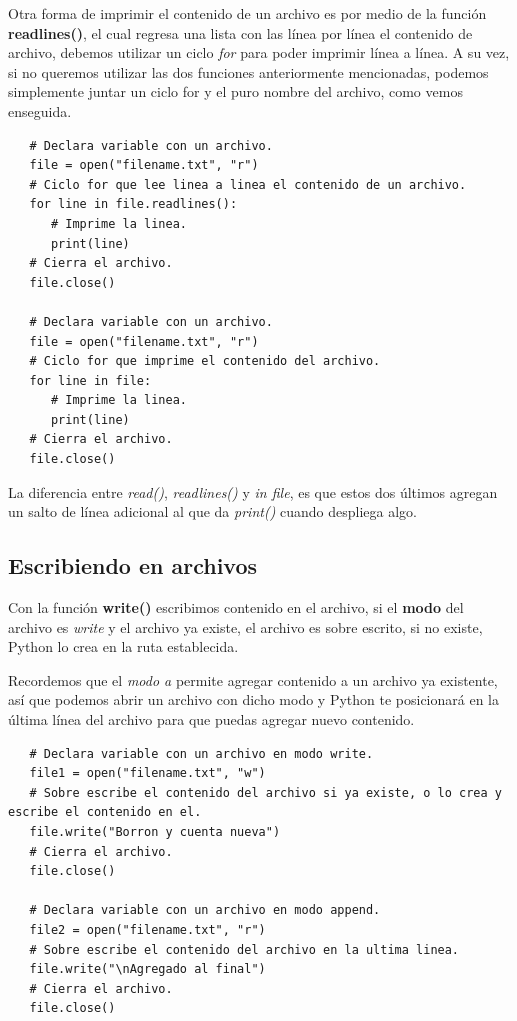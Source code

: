 Otra forma de imprimir el contenido de un archivo es por medio de la función \textbf{readlines()}, el cual regresa una lista con las línea por línea el contenido de archivo, debemos utilizar un ciclo \textit{for} para poder imprimir línea a línea. A su vez, si no queremos utilizar las dos funciones anteriormente mencionadas, podemos simplemente juntar un ciclo for y el puro nombre del archivo, como vemos enseguida.
\begin{lstlisting}
   # Declara variable con un archivo.
   file = open("filename.txt", "r")
   # Ciclo for que lee linea a linea el contenido de un archivo.
   for line in file.readlines():
      # Imprime la linea.
      print(line)
   # Cierra el archivo.
   file.close()
   
   # Declara variable con un archivo.
   file = open("filename.txt", "r")
   # Ciclo for que imprime el contenido del archivo.
   for line in file:
      # Imprime la linea.
      print(line)
   # Cierra el archivo.
   file.close()
\end{lstlisting}

La diferencia entre \textit{read()}, \textit{readlines()} y \textit{in file}, es que estos dos últimos agregan un salto de línea adicional al que da \textit{print()} cuando despliega algo.


\subsection{Escribiendo en archivos}
\hspace{0.55cm}Con la función \textbf{write()} escribimos contenido en el archivo, si el \textbf{modo} del archivo es \textit{write} y el archivo ya existe, el archivo es sobre escrito, si no existe, Python lo crea en la ruta establecida.

Recordemos que el \textit{modo a} permite agregar contenido a un archivo ya existente, así que podemos abrir un archivo con dicho modo y Python te posicionará en la última línea del archivo para que puedas agregar nuevo contenido.
\begin{lstlisting}
   # Declara variable con un archivo en modo write.
   file1 = open("filename.txt", "w")
   # Sobre escribe el contenido del archivo si ya existe, o lo crea y escribe el contenido en el.
   file.write("Borron y cuenta nueva")
   # Cierra el archivo.
   file.close()
   
   # Declara variable con un archivo en modo append.
   file2 = open("filename.txt", "r")
   # Sobre escribe el contenido del archivo en la ultima linea.
   file.write("\nAgregado al final")
   # Cierra el archivo.
   file.close()
\end{lstlisting}

